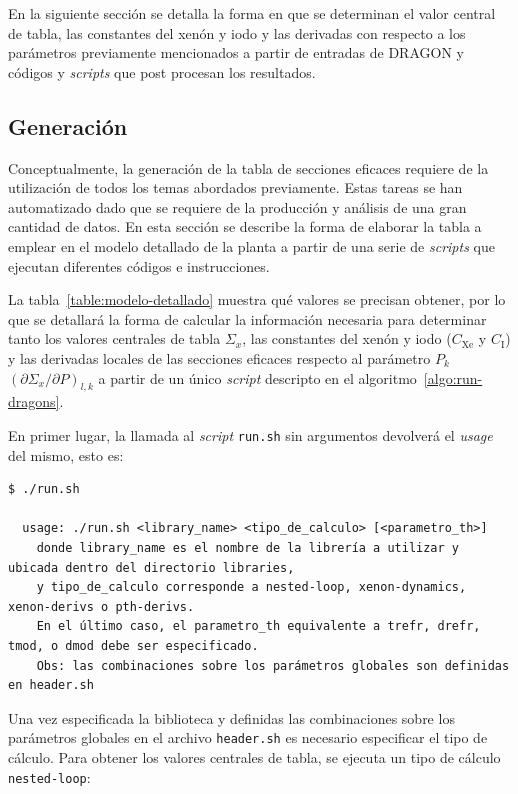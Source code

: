 \documentclass[11pt]{article}
\begin{document}
\noindent
En la siguiente sección se detalla la forma en que se determinan el valor central de tabla, las constantes del xenón y iodo y las derivadas con respecto a los parámetros previamente mencionados a partir de entradas de DRAGON y códigos y \emph{scripts} que post procesan los resultados.


\subsection{Generación}

Conceptualmente, la generación de la tabla de secciones eficaces requiere de la utilización de todos los temas abordados previamente. Estas tareas se han automatizado dado que se requiere de la producción y análisis de una gran cantidad de datos. En esta sección se describe la forma de elaborar la tabla a emplear en el modelo detallado de la planta a partir de una serie de \emph{scripts} que ejecutan diferentes códigos e instrucciones.

La tabla~\ref{table:modelo-detallado} muestra qué valores se precisan obtener, por lo que se detallará la forma de calcular la información necesaria para determinar tanto los valores centrales de tabla $\Sigma_x$, las constantes del xenón y iodo ($C_{\text{Xe}}$ y $C_{\text{I}}$) y las derivadas locales de las secciones eficaces respecto al parámetro $P_k$ $\left( \partial\Sigma_x / \partial P \right)_{l,k}$ a partir de un único \emph{script} descripto en el algoritmo~\ref{algo:run-dragons}.

En primer lugar, la llamada al \emph{script} \texttt{run.sh} sin argumentos devolverá el \emph{usage} del mismo, esto es:

\begin{lstlisting}[style=bash_tecna]
$ ./run.sh 

  usage: ./run.sh <library_name> <tipo_de_calculo> [<parametro_th>] 
    donde library_name es el nombre de la librería a utilizar y ubicada dentro del directorio libraries,
    y tipo_de_calculo corresponde a nested-loop, xenon-dynamics, xenon-derivs o pth-derivs. 
    En el último caso, el parametro_th equivalente a trefr, drefr, tmod, o dmod debe ser especificado.
    Obs: las combinaciones sobre los parámetros globales son definidas en header.sh

\end{lstlisting}

Una vez especificada la biblioteca y definidas las combinaciones sobre los parámetros globales en el archivo \texttt{header.sh} es necesario especificar el tipo de cálculo. Para obtener los valores centrales de tabla, se ejecuta un tipo de cálculo \texttt{nested-loop}:
\end{document}

